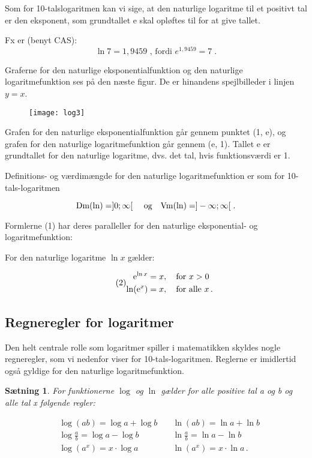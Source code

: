 \documentclass[12pt,oneside,a4paper]{article}
\theoremstyle{plain}
\newtheorem*{thm}{Sætning}
\begin{document}
\begin{tcolorbox}
Som for 10-talslogaritmen kan vi sige, at den naturlige logaritme til et
positivt tal er den eksponent, som grundtallet e skal opløftes til for at give
tallet.
\end{tcolorbox}

Fx er (benyt CAS):
\[
\ln 7 = 1,9459 \text{ , fordi } e^{1,9459} = 7 \; .
\]

Graferne for den naturlige eksponentialfunktion og den naturlige
logaritmefunktion ses på den næste figur. De er hinandens spejlbilleder i linjen $y =
x$.

\begin{figure}[H]
    \centering
    \texttt{[image: log3]}
    \caption{}
    \label{fig3}
\end{figure}

Grafen for den naturlige eksponentialfunktion går gennem punktet (1, e), og
grafen for den naturlige logaritmefunktion går gennem (e, 1). Tallet e er
grundtallet for den naturlige logaritme, dvs. det tal, hvis funktionsværdi er
1.

Definitions- og værdimængde for den naturlige logaritmefunktion er som for
10-tals-logaritmen

\[
\mathrm{Dm}(\ln) = ]0; \infty[ \text{ \quad og\quad } \mathrm{Vm}(\ln) = ]-\infty; \infty[ \; .
\]

Formlerne (1) har deres paralleller for den naturlige eksponential- og
logaritmefunktion:

For den naturlige logaritme $\ln x$ gælder:

\[
    \tag{2}
    \begin{aligned}
        {\rm e}^{\ln x } &= x,\quad \text{for $x > 0$} \\
        \ln ({\rm e}^x) &= x,\quad \text{for alle $x$\,.}
    \end{aligned}
\]

\subsection*{Regneregler for logaritmer}

Den helt centrale rolle som logaritmer spiller i matematikken skyldes nogle
regneregler, som vi nedenfor viser for 10-tals-logaritmen. Reglerne er
imidlertid også gyldige for den naturlige logaritmefunktion.

\begin{tcolorbox}
\begin{thm}

For funktionerne $\log$ og $\ln$ gælder for alle positive tal a og b og alle tal x
følgende regler:

\[
    \begin{aligned}
        &\log (ab) = \log a + \log b \quad  &\ln(ab) = \ln a + \ln b  \\
        &\log \frac{a}{b} = \log a - \log b &\ln \frac{a}{b} = \ln a - \ln b \\
        &\log(a^x) = x \cdot \log a         &\ln(a^x) = x \cdot \ln a \, .
    \end{aligned}
\]
\end{thm}
\end{tcolorbox}
\end{document}

